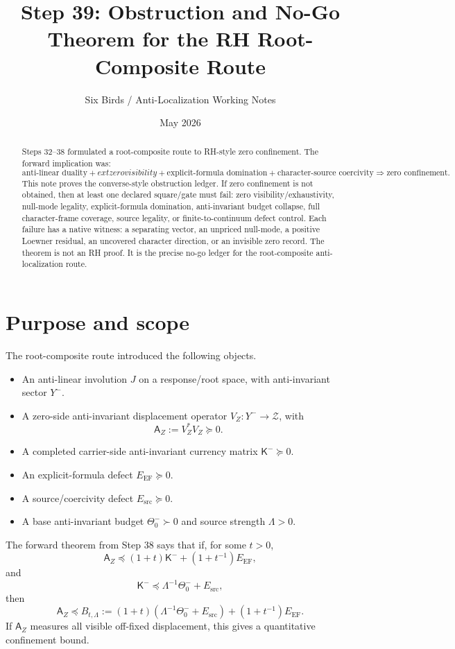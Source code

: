 \documentclass[11pt]{article}
\title{Step 39: Obstruction and No-Go Theorem for the RH Root-Composite Route}
\author{Six Birds / Anti-Localization Working Notes}
\date{May 2026}
\newcommand{\K}{\mathsf K}
\newcommand{\A}{\mathsf A}
\newcommand{\EF}{\mathrm{EF}}
\newcommand{\src}{\mathrm{src}}
\newcommand{\pre}{\preceq}
\begin{document}
\maketitle

\begin{abstract}
Steps 32--38 formulated a root-composite route to RH-style zero confinement.  The forward implication was:
\[
\text{anti-linear duality}+	ext{zero visibility}+\text{explicit-formula domination}+\text{character-source coercivity}
\Longrightarrow
\text{zero confinement.}
\]
This note proves the converse-style obstruction ledger.  If zero confinement is not obtained, then at least one declared square/gate must fail: zero visibility/exhaustivity, null-mode legality, explicit-formula domination, anti-invariant budget collapse, full character-frame coverage, source legality, or finite-to-continuum defect control.  Each failure has a native witness: a separating vector, an unpriced null-mode, a positive Loewner residual, an uncovered character direction, or an invisible zero record.  The theorem is not an RH proof.  It is the precise no-go ledger for the root-composite anti-localization route.
\end{abstract}

\section{Purpose and scope}

The root-composite route introduced the following objects.
\begin{itemize}[leftmargin=2em]
  \item An anti-linear involution $J$ on a response/root space, with anti-invariant sector $Y^-$.
  \item A zero-side anti-invariant displacement operator $V_Z:Y^-\to\mathcal Z$, with
  \[
  \A_Z:=V_Z^*V_Z\succeq0.
  \]
  \item A completed carrier-side anti-invariant currency matrix $\K^-\succeq0$.
  \item An explicit-formula defect $E_{\EF}\succeq0$.
  \item A source/coercivity defect $E_{\src}\succeq0$.
  \item A base anti-invariant budget $\Theta_0^-\succ0$ and source strength $\Lambda>0$.
\end{itemize}

The forward theorem from Step 38 says that if, for some $t>0$,
\begin{equation}\label{eq:ef-domination}
\A_Z\pre (1+t)\K^-+(1+t^{-1})E_{\EF},
\end{equation}
and
\begin{equation}\label{eq:budget-collapse}
\K^-\pre \Lambda^{-1}\Theta_0^-+E_{\src},
\end{equation}
then
\begin{equation}\label{eq:confinement-bound}
\A_Z\pre B_{t,\Lambda}:=(1+t)(\Lambda^{-1}\Theta_0^-+E_{\src})+(1+t^{-1})E_{\EF}.
\end{equation}
If $\A_Z$ measures all visible off-fixed displacement, this gives a quantitative confinement bound.
\end{document}
